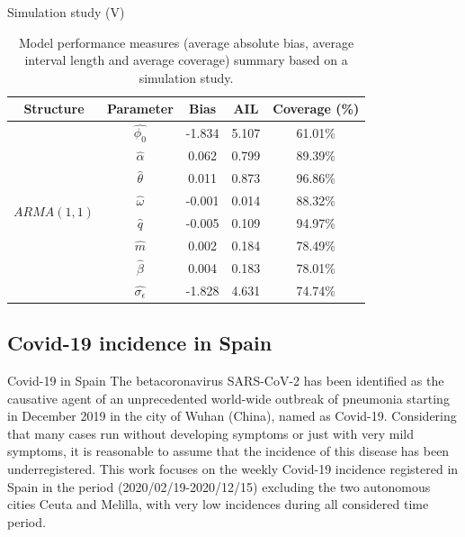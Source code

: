 \documentclass[
    10pt,
    aspectratio=169,
    usenames,
    dvipsnames
]{beamer}
\begin{document}
\begin{frame}{Simulation study (V)}
  \begin{table}
    \caption{Model performance measures (average absolute bias, average interval length and average coverage) summary based on a simulation study.}
    \begin{tabular}{ccccc}
\toprule
\textbf{Structure} & \textbf{Parameter} & \textbf{Bias} & \textbf{AIL} & \textbf{Coverage (\%)}\\
\midrule
\multirow{8}{*}{$ARMA(1, 1)$} & $\hat{\phi_0}$            & -1.834 & 5.107 & 61.01\% \\
                              & $\hat{\alpha}$            & 0.062  & 0.799 & 89.39\% \\
                              & $\hat{\theta}$            & 0.011  & 0.873 & 96.86\% \\
                              & $\hat{\omega}$            & -0.001 & 0.014 & 88.32\% \\
                              & $\hat{q}$                 & -0.005 & 0.109 & 94.97\% \\
                              & $\hat{m}$                 & 0.002  & 0.184 & 78.49\% \\
                              & $\hat{\beta}$             & 0.004  & 0.183 & 78.01\% \\
                              & $\hat{\sigma_{\epsilon}}$ & -1.828 & 4.631 & 74.74\% \\
\bottomrule
\end{tabular}
  \end{table}
\end{frame}

\subsection{Covid-19 incidence in Spain}
\begin{frame}{Covid-19 in Spain}
The betacoronavirus SARS-CoV-2 has been identified as the causative agent of an unprecedented world-wide outbreak of pneumonia starting in December 2019 in the city of Wuhan (China), named as Covid-19. Considering that many cases run without developing symptoms or just with very mild symptoms, it is reasonable to assume that the incidence of this disease has been underregistered. This work focuses on the weekly Covid-19 incidence registered in Spain in the period (2020/02/19-2020/12/15) excluding the two autonomous cities Ceuta and Melilla, with very low incidences during all considered time period.
\end{frame}
\end{document}
